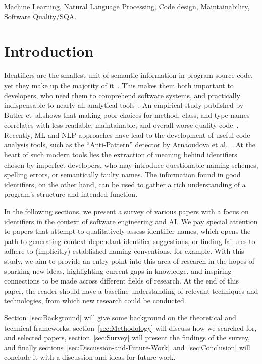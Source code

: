 \documentclass[conference]{IEEEtran}
\begin{document}
\begin{IEEEkeywords}
Machine Learning, Natural Language Processing, Code design, Maintainability, Software
Quality/SQA.
\end{IEEEkeywords}

\section{Introduction}
\label{sec:Introduction}

Identifiers are the smallest unit of semantic information in program source code, yet they
make up the majority of it~\cite{Butler2010Empirical}. This makes them both important to
developers, who need them to comprehend software systems,  and practically indispensable
to nearly all analytical tools~\cite{Gao2019IdentGen}. An empirical study published by
Butler et~al.\@ shows that making poor choices for method, class, and type names
correlates with less readable, maintainable, and overall worse quality
code~\cite{Butler2010Empirical}. Recently, \ac{ML} and \ac{NLP} approaches have lead to
the development of useful code analysis tools, such as the ``Anti-Pattern'' detector by
Arnaoudova et al.\@~\cite{Arnaoudova2013LAs}. At the heart of such modern tools lies the
extraction of meaning behind identifiers chosen by imperfect developers, who may introduce
questionable naming schemes, spelling errors, or semantically faulty names. The
information found in good identifiers, on the other hand, can be used to gather a rich
understanding of a program's structure and intended function.

In the following sections, we present a survey of various papers with a focus on
identifiers in the context of software engineering and \ac{AI}. We pay special attention
to papers that attempt to qualitatively assess identifier names, which opens the path to
generating context-dependant identifier suggestions, or finding failures to adhere to
(implicitly) established naming conventions, for example. With this study, we aim to
provide an entry point into this area of research in the hopes of sparking new ideas,
highlighting current gaps in knowledge, and inspiring connections to be made across
different fields of research. At the end of this paper, the reader should have a baseline
understanding of relevant techniques and technologies, from which new research could be
conducted.

Section~\ref{sec:Background} will give some background on the theoretical and technical
frameworks, section~\ref{sec:Methodology} will discuss how we searched for, and selected
papers, section~\ref{sec:Survey} will present the findings of the survey, and finally
sections~\ref{sec:Discussion-and-Future-Work}~and~\ref{sec:Conclusion} will conclude it
with a discussion and ideas for future work.
\end{document}

